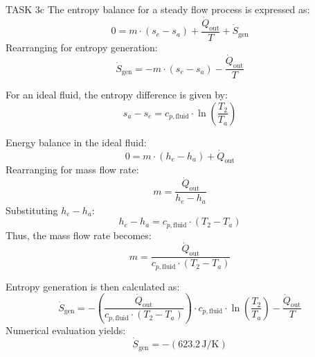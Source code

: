 TASK 3c  
The entropy balance for a steady flow process is expressed as:  
\[
0 = m \cdot (s_e - s_a) + \frac{\dot{Q}_{\text{out}}}{T} + \dot{S}_{\text{gen}}
\]  
Rearranging for entropy generation:  
\[
\dot{S}_{\text{gen}} = -m \cdot (s_e - s_a) - \frac{\dot{Q}_{\text{out}}}{T}
\]  

For an ideal fluid, the entropy difference is given by:  
\[
s_a - s_e = c_{p,\text{fluid}} \cdot \ln \left( \frac{T_2}{T_a} \right)
\]  

Energy balance in the ideal fluid:  
\[
0 = m \cdot (h_e - h_a) + \dot{Q}_{\text{out}}
\]  
Rearranging for mass flow rate:  
\[
m = \frac{\dot{Q}_{\text{out}}}{h_e - h_a}
\]  
Substituting \( h_e - h_a \):  
\[
h_e - h_a = c_{p,\text{fluid}} \cdot (T_2 - T_a)
\]  
Thus, the mass flow rate becomes:  
\[
m = \frac{\dot{Q}_{\text{out}}}{c_{p,\text{fluid}} \cdot (T_2 - T_a)}
\]  

Entropy generation is then calculated as:  
\[
\dot{S}_{\text{gen}} = -\left( \frac{\dot{Q}_{\text{out}}}{c_{p,\text{fluid}} \cdot (T_2 - T_a)} \right) \cdot c_{p,\text{fluid}} \cdot \ln \left( \frac{T_2}{T_a} \right) - \frac{\dot{Q}_{\text{out}}}{T}
\]  
Numerical evaluation yields:  
\[
\dot{S}_{\text{gen}} = -(623.2 \, \text{J/K})
\]
